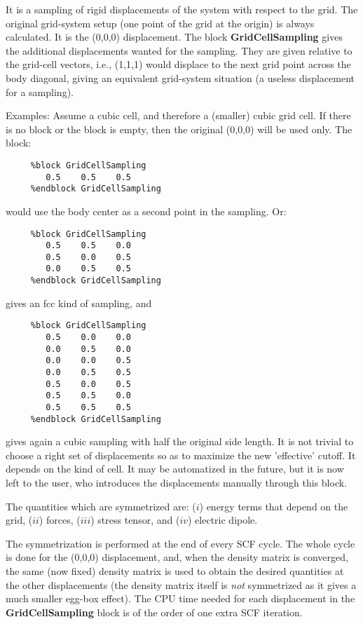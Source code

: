 \documentclass[11pt]{article}
\begin{document}
\begin{description}
It is a sampling of rigid displacements of the system with respect
to the grid. The original grid-system setup (one point of the grid
at the origin) is always calculated. It is the (0,0,0) displacement.
The block {\bf GridCellSampling} gives the additional displacements
wanted for the sampling. They are given relative to the grid-cell
vectors, i.e., (1,1,1) would displace to the next grid point across
the body diagonal, giving an equivalent grid-system situation
(a useless displacement for a sampling).

Examples: Assume a cubic cell, and therefore a (smaller) cubic grid cell.
If there is no block or the block is empty, then the original (0,0,0)
will be used only. The block:

\begin{verbatim}
     %block GridCellSampling
        0.5    0.5    0.5
     %endblock GridCellSampling
\end{verbatim}

would use the body center as a second point in the sampling. Or:


\begin{verbatim}
     %block GridCellSampling
        0.5    0.5    0.0
        0.5    0.0    0.5
        0.0    0.5    0.5
     %endblock GridCellSampling
\end{verbatim}

gives an fcc kind of sampling, and

\begin{verbatim}
     %block GridCellSampling
        0.5    0.0    0.0
        0.0    0.5    0.0
        0.0    0.0    0.5
        0.0    0.5    0.5
        0.5    0.0    0.5
        0.5    0.5    0.0
        0.5    0.5    0.5
     %endblock GridCellSampling
\end{verbatim}

gives again a cubic sampling with half the original side length.
It is not trivial to choose a right set of displacements so as
to maximize the new 'effective' cutoff. It depends on the
kind of cell. It may be automatized in the future, but it
is now left to the user, who introduces the displacements
manually through this block.

The quantities which are symmetrized are: ($i$) energy terms
that depend on the grid, ($ii$) forces, ($iii$) stress
tensor, and ($iv$) electric dipole.

The symmetrization is performed at the end of every SCF cycle. The
whole cycle is done for the (0,0,0) displacement, and, when the
density matrix is converged, the same (now fixed)
density matrix is used to obtain the desired quantities at the
other displacements (the density matrix itself is {\it not}
symmetrized as it gives a much smaller egg-box effect).
The CPU time needed for each displacement
in the {\bf GridCellSampling} block
is of the order of one extra SCF iteration.


\end{description}
\end{document}
